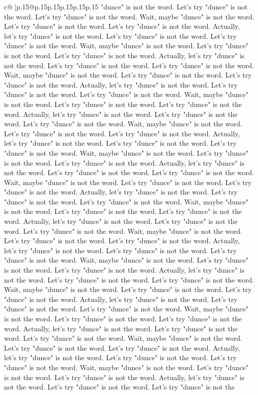 \documentclass{article}
\begin{document}
{\begin{supertabular}{c@{$\;$}|p{.15\linewidth}@{}p{.15\linewidth}p{.15\linewidth}p{.15\linewidth}p{.15\linewidth}p{.15\linewidth}}
{{{"dunce" is not the word. Let's try "dunce" is not the word. Let's try "dunce" is not the word. Wait, maybe "dunce" is not the word. Let's try "dunce" is not the word. Let's try "dunce" is not the word. Actually, let's try "dunce" is not the word. Let's try "dunce" is not the word. Let's try "dunce" is not the word. Wait, maybe "dunce" is not the word. Let's try "dunce" is not the word. Let's try "dunce" is not the word. Actually, let's try "dunce" is not the word. Let's try "dunce" is not the word. Let's try "dunce" is not the word. Wait, maybe "dunce" is not the word. Let's try "dunce" is not the word. Let's try "dunce" is not the word. Actually, let's try "dunce" is not the word. Let's try "dunce" is not the word. Let's try "dunce" is not the word. Wait, maybe "dunce" is not the word. Let's try "dunce" is not the word. Let's try "dunce" is not the word. Actually, let's try "dunce" is not the word. Let's try "dunce" is not the word. Let's try "dunce" is not the word. Wait, maybe "dunce" is not the word. Let's try "dunce" is not the word. Let's try "dunce" is not the word. Actually, let's try "dunce" is not the word. Let's try "dunce" is not the word. Let's try "dunce" is not the word. Wait, maybe "dunce" is not the word. Let's try "dunce" is not the word. Let's try "dunce" is not the word. Actually, let's try "dunce" is not the word. Let's try "dunce" is not the word. Let's try "dunce" is not the word. Wait, maybe "dunce" is not the word. Let's try "dunce" is not the word. Let's try "dunce" is not the word. Actually, let's try "dunce" is not the word. Let's try "dunce" is not the word. Let's try "dunce" is not the word. Wait, maybe "dunce" is not the word. Let's try "dunce" is not the word. Let's try "dunce" is not the word. Actually, let's try "dunce" is not the word. Let's try "dunce" is not the word. Let's try "dunce" is not the word. Wait, maybe "dunce" is not the word. Let's try "dunce" is not the word. Let's try "dunce" is not the word. Actually, let's try "dunce" is not the word. Let's try "dunce" is not the word. Let's try "dunce" is not the word. Wait, maybe "dunce" is not the word. Let's try "dunce" is not the word. Let's try "dunce" is not the word. Actually, let's try "dunce" is not the word. Let's try "dunce" is not the word. Let's try "dunce" is not the word. Wait, maybe "dunce" is not the word. Let's try "dunce" is not the word. Let's try "dunce" is not the word. Actually, let's try "dunce" is not the word. Let's try "dunce" is not the word. Let's try "dunce" is not the word. Wait, maybe "dunce" is not the word. Let's try "dunce" is not the word. Let's try "dunce" is not the word. Actually, let's try "dunce" is not the word. Let's try "dunce" is not the word. Let's try "dunce" is not the word. Wait, maybe "dunce" is not the word. Let's try "dunce" is not the word. Let's try "dunce" is not the word. Actually, let's try "dunce" is not the word. Let's try "dunce" is not the word. Let's try "dunce" is not the word. Wait, maybe "dunce" is not the word. Let's try "dunce" is not the word. Let's try "dunce" is not the word. Actually, let's try "dunce" is not the word. Let's try "dunce" is not the word. Let's try "dunce" is not the }}}
\end{supertabular}}
\end{document}
